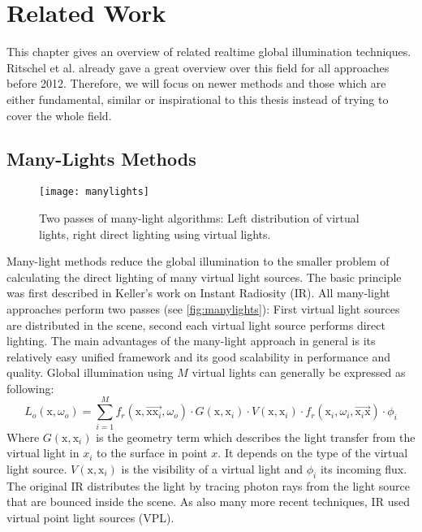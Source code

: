\documentclass[thesis.tex]{subfiles}
\begin{document}
\chapter{Related Work}
\label{chap:prevwork}


This chapter gives an overview of related realtime global illumination techniques.
Ritschel et al. \cite{bib:RealtimeGIOverview} already gave a great overview over this field for all approaches before 2012.
Therefore, we will focus on newer methods and those which are either fundamental, similar or inspirational to this thesis instead of trying to cover the whole field.

\section {Many-Lights Methods}
\begin{figure}[h]
	\centering
	\texttt{[image: manylights]}
	\caption{\cite{bib:manylightssurvey2014} Two passes of many-light algorithms: Left distribution of virtual lights, right direct lighting using virtual lights.} \label{fig:manylights}
\end{figure}
Many-light methods reduce the global illumination to the smaller problem of calculating the direct lighting of many virtual light sources.
The basic principle was first described in Keller's work on Instant Radiosity \cite{bib:instantradiosity} (IR).
All many-light approaches perform two passes (see \autoref{fig:manylights}):
First virtual light sources are distributed in the scene, second each virtual light source performs direct lighting.
The main advantages of the many-light approach in general is its relatively easy unified framework and its good scalability in performance and quality.
Global illumination using $M$ virtual lights can generally be expressed as following:
\begin{equation}
L_o(\mathrm{x}, \omega_o) = \sum\limits_{i=1}^{M} f_r(\mathrm{x}, \overrightarrow{\mathrm{x}\mathrm{x}_i}, \omega_o) \cdot G(\mathrm{x}, \mathrm{x}_i) \cdot V(\mathrm{x}, \mathrm{x}_i) \cdot f_r(\mathrm{x}_i, \omega_i, \overrightarrow{\mathrm{x}_i\mathrm{x}}) \cdot \phi_i
\end{equation}
Where $G(\mathrm{x}, \mathrm{x}_i)$ is the geometry term which describes the light transfer from the virtual light in $x_i$ to the surface in point $x$.
It depends on the type of the virtual light source.
$V(\mathrm{x}, \mathrm{x}_i)$ is the visibility of a virtual light and $\phi_i$ its incoming flux.
The original IR distributes the light by tracing photon rays from the light source that are bounced inside the scene.
As also many more recent techniques, IR used virtual point light sources (VPL).
\end{document}
